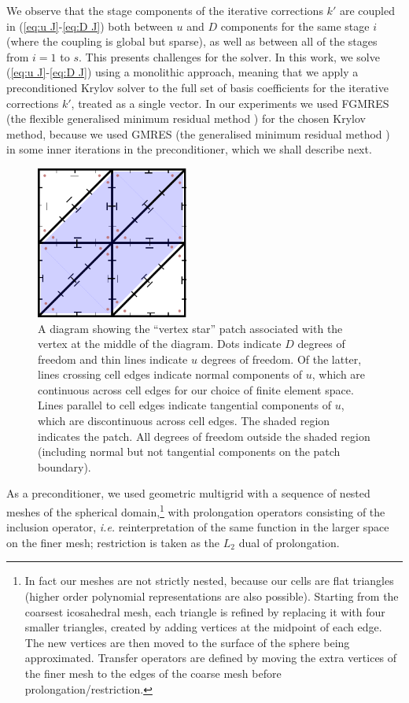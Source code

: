 \documentclass[a4paper, 12pt]{article}
\begin{document}
We observe that the stage components of the iterative corrections $k'$
are coupled in (\ref{eq:u J}-\ref{eq:D J}) both between $u$ and $D$
components for the same stage $i$ (where the coupling is global but
sparse), as well as between all of the stages from $i=1$ to $s$. This
presents challenges for the solver. In this work, we solve (\ref{eq:u
  J}-\ref{eq:D J}) using a monolithic approach, meaning that we apply
a preconditioned Krylov solver to the full set of basis coefficients
for the iterative corrections $k'$,
treated as a single vector. In our experiments we used FGMRES (the
flexible generalised minimum residual method \citep{saad1993flexible})
for the chosen Krylov method, because we used GMRES (the generalised
minimum residual method \citep{saad1986gmres}) in some inner
iterations in the preconditioner, which we shall describe next.

\begin{figure}
  \center
  \includegraphics[width=5cm]{Images/patch}
  \caption{\label{fig:patch} A diagram showing the ``vertex
    star'' patch associated with the vertex at the middle of the
    diagram. Dots indicate $D$ degrees of freedom and thin lines
    indicate $u$ degrees of freedom. Of the latter, lines crossing
    cell edges indicate normal components of $u$, which are continuous
    across cell edges for our choice of finite element space.  Lines
    parallel to cell edges indicate tangential components of $u$,
    which are discontinuous across cell edges.  The shaded region
    indicates the patch.  All degrees of freedom outside the shaded
    region (including normal but not tangential components on the
    patch boundary).
  }
 \end{figure}



As a preconditioner, we used geometric multigrid with a sequence of
nested meshes of the spherical domain,\footnote{In fact our meshes are
not strictly nested, because our cells are flat triangles (higher
order polynomial representations are also possible). Starting from the
coarsest icosahedral mesh, each triangle is refined by replacing it
with four smaller triangles, created by adding vertices at the
midpoint of each edge. The new vertices are then moved to the surface
of the sphere being approximated. Transfer operators are defined by
moving the extra vertices of the finer mesh to the edges of the coarse
mesh before prolongation/restriction.} with prolongation operators
consisting of the inclusion operator, \emph{i.e.} reinterpretation of
the same function in the larger space on the finer mesh; restriction
is taken as the $L_2$ dual of prolongation.
\end{document}
